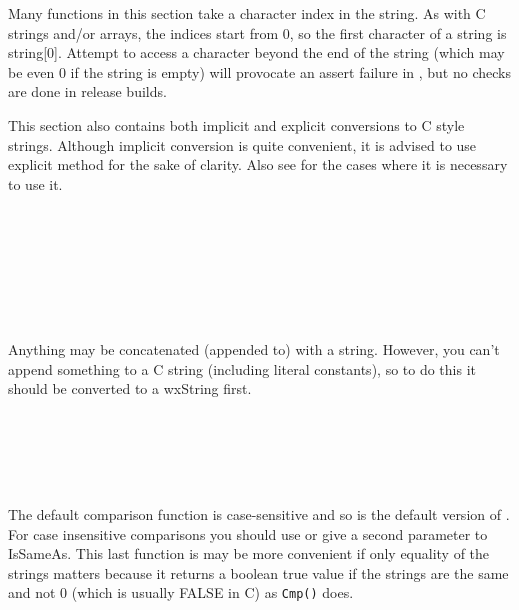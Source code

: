 
Many functions in this section take a character index in the string. As with C
strings and/or arrays, the indices start from $0$, so the first character of a
string is string[$0$]. Attempt to access a character beyond the end of the
string (which may be even $0$ if the string is empty) will provocate an assert
failure in , but no checks are done in
release builds.

This section also contains both implicit and explicit conversions to C style
strings. Although implicit conversion is quite convenient, it is advised to use
explicit  method for the sake of clarity. Also
see  for the cases where it is necessary to
use it.

\\
\\
\\
\\
\\
\\


Anything may be concatenated (appended to) with a string. However, you can't
append something to a C string (including literal constants), so to do this it
should be converted to a wxString first.

\\
\\
\\
\\


The default comparison function  is case-sensitive and
so is the default version of . For case
insensitive comparisons you should use  or
give a second parameter to IsSameAs. This last function is may be more
convenient if only equality of the strings matters because it returns a boolean
true value if the strings are the same and not 0 (which is usually FALSE in C)
as {\tt Cmp()} does.

